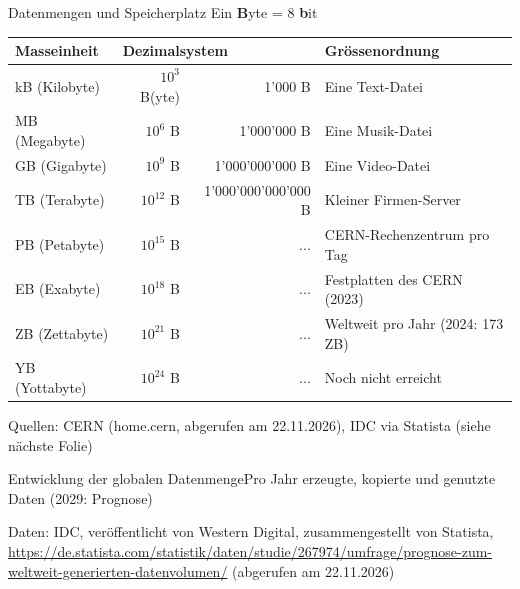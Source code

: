 \begin{frame}{Datenmengen und Speicherplatz}
  \centering
  \scriptsize
  Ein \textbf{B}yte = 8 \textbf{b}it
  \begin{table}[H]
    \begin{tabular}{@{}lrrl@{}}
      \toprule
      \textbf{Masseinheit} & \multicolumn{2}{l}{\textbf{Dezimalsystem}} & Grössenordnung                                   \\ \midrule
      kB (Kilobyte)        & $10^3$ B(yte)                               & 1'000 B             & Eine Text-Datei            \\
      MB (Megabyte)        & $10^6$ B                                    & 1'000'000 B         & Eine Musik-Datei           \\
      GB (Gigabyte)        & $10^9$ B                                    & 1'000'000'000 B     & Eine Video-Datei           \\
      TB (Terabyte)        & $10^{12}$ B                                 & 1'000'000'000'000 B & Kleiner Firmen-Server      \\
      PB (Petabyte)        & $10^{15}$ B                                 & ...                 & CERN-Rechenzentrum pro Tag \\
      EB (Exabyte)         & $10^{18}$ B                                 & ...                 & Festplatten des CERN (2023) \\
      ZB (Zettabyte)       & $10^{21}$ B                                 & ...                 & Weltweit pro Jahr (2024: 173 ZB) \\
      YB (Yottabyte)       & $10^{24}$ B                                 & ...                 & Noch nicht erreicht        \\ \bottomrule
    \end{tabular}
  \end{table}
  {\tiny Quellen: CERN (home.cern, abgerufen am 22.11.2026), IDC via Statista (siehe nächste Folie)}
\end{frame}


\begin{frame}{Entwicklung der globalen Datenmenge}{Pro Jahr erzeugte, kopierte und genutzte Daten (2029: Prognose)}
  \begin{figure}[H]
    \centering
  \end{figure}
  {\tiny Daten: IDC, veröffentlicht von Western Digital, zusammengestellt von Statista,\\ \url{https://de.statista.com/statistik/daten/studie/267974/umfrage/prognose-zum-weltweit-generierten-datenvolumen/} (abgerufen am 22.11.2026)}
\end{frame}

